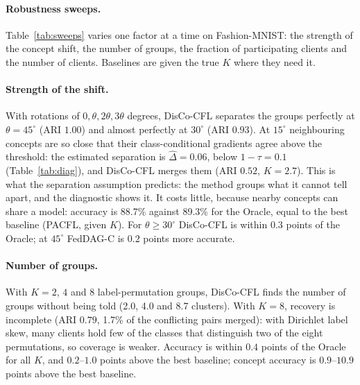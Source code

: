 \paragraph{Robustness sweeps.}\label{sec:sweeps}
Table~\ref{tab:sweeps} varies one factor at a time on Fashion-MNIST: the strength of the concept shift, the number of groups, the fraction of participating clients and the number of clients. Baselines are given the true $K$ where they need it.

\begin{tableorg}[!htbp]
\centering
\caption{Robustness sweeps (Fashion-MNIST, 3 seeds; the $90^\circ$ row repeats the \emph{Rotation} scenario with 5 seeds). For DisCo-CFL: ARI, number of clusters, conflict-merge rate, accuracy and concept accuracy. For comparison: the best baseline on accuracy and on concept accuracy (in parentheses), and the Oracle's accuracy.}\label{tab:sweeps}

\end{tableorg}

\paragraph{Strength of the shift.} With rotations of $0,\theta,2\theta,3\theta$ degrees, DisCo-CFL separates the groups perfectly at $\theta=45^\circ$ (ARI $1.00$) and almost perfectly at $30^\circ$ (ARI $0.93$). At $15^\circ$ neighbouring concepts are so close that their class-conditional gradients agree above the threshold: the estimated separation is $\hat\Delta=0.06$, below $1-\tau=0.1$ (Table~\ref{tab:diag}), and DisCo-CFL merges them (ARI $0.52$, $K=2.7$). This is what the separation assumption predicts: the method groups what it cannot tell apart, and the diagnostic shows it. It costs little, because nearby concepts can share a model: accuracy is 88.7\% against 89.3\% for the Oracle, equal to the best baseline (PACFL, given $K$). For $\theta\ge30^\circ$ DisCo-CFL is within $0.3$ points of the Oracle; at $45^\circ$ FedDAG-C is $0.2$ points more accurate.

\paragraph{Number of groups.} With $K=2$, $4$ and $8$ label-permutation groups, DisCo-CFL finds the number of groups without being told (2.0, 4.0 and 8.7 clusters). With $K=8$, recovery is incomplete (ARI $0.79$, 1.7\% of the conflicting pairs merged): with Dirichlet label skew, many clients hold few of the classes that distinguish two of the eight permutations, so coverage is weaker. Accuracy is within $0.4$ points of the Oracle for all $K$, and $0.2$--$1.0$ points above the best baseline; concept accuracy is $0.9$--$10.9$ points above the best baseline.

